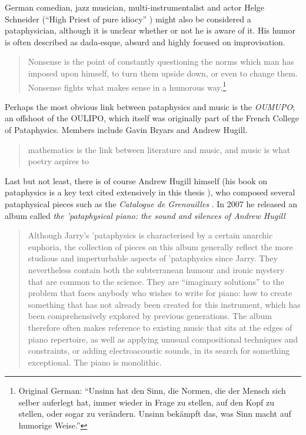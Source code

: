 German comedian, jazz musician, multi-instrumentalist and actor Helge Schneider (``High Priest of pure idiocy'' \autocite{Bolz1997}) might also be considered a pataphysician, although it is unclear whether or not he is aware of it. His humor is often described as dada-esque, absurd and highly focused on improvisation.

\begin{quotation}
  Nonsense is the point of constantly questioning the norms which man has imposed upon himself, to turn them upside down, or even to change them. Nonsense fights what makes sense in a humorous way.\footnote{Original German: ``Unsinn hat den Sinn, die Normen, die der Mensch sich selber auferlegt hat, immer wieder in Frage zu stellen, auf den Kopf zu stellen, oder sogar zu verändern. Unsinn bekämpft das, was Sinn macht auf humorige Weise.''}
\end{quotation}

Perhaps the most obvious link between pataphysics and music is the \emph{OUMUPO}; an offshoot of the \ac{OULIPO}, which itself was originally part of the French College of Pataphysics. Members include Gavin Bryars and Andrew Hugill.

\begin{quotation}
  mathematics is the link between literature and music, and music is what poetry aspires to 
\end{quotation}

Last but not least, there is of course Andrew Hugill himself (his book on pataphysics is a key text cited extensively in this thesis \autocite[see][]{Hugill2012}), who composed several pataphysical pieces such as the \textit{Catalogue de Grenouilles} \autocite{Hugill1987} \autocite[see][for a full catalogue of his work]{Hugill2015}. In 2007 he released an album called \textit{the {'}pataphysical piano: the sound and silences of Andrew Hugill} \autocite{Hugill2007}

\begin{quotation}
  Although Jarry's {'}pataphysics is characterised by a certain anarchic euphoria, the collection of pieces on this album generally reflect the more studious and imperturbable aspects of {'}pataphysics since Jarry. They nevertheless contain both the subterranean humour and ironic mystery that are common to the science. They are ``imaginary solutions'' to the problem that faces anybody who wishes to write for piano: how to create something that has not already been created for this instrument, which has been comprehensively explored by previous generations. The album therefore often makes reference to existing music that sits at the edges of piano repertoire, as well as applying unusual compositional techniques and constraints, or adding electroacoustic sounds, in its search for something exceptional. The piano is monolithic. 
\end{quotation}


